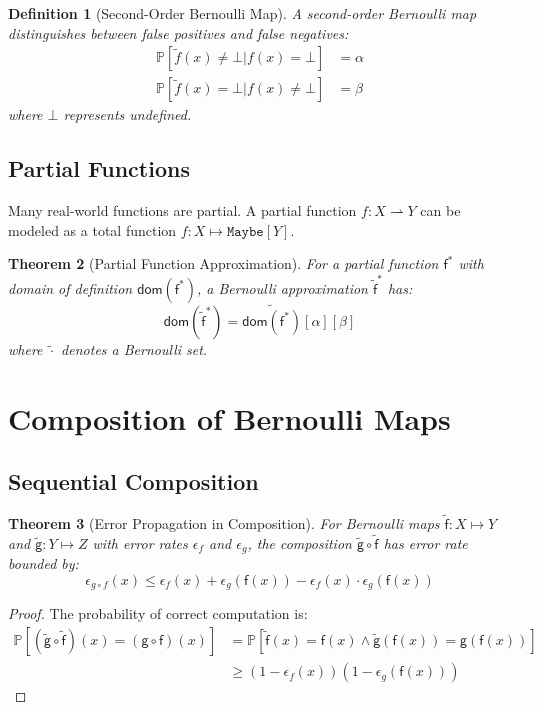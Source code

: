 \documentclass[11pt,final,hidelinks]{article}
\newtheorem{theorem}{Theorem}[section]
\newtheorem{definition}[theorem]{Definition}
\newcommand{\obs}[1]{\widetilde{#1}}  %
\newcommand{\Fun}[1]{\mathsf{#1}}     %
\newcommand{\AFun}[1]{\obs{\mathsf{#1}}}  %
\newcommand{\PFun}[1]{\mathsf{#1}^*}      %
\newcommand{\APFun}[1]{\obs{\mathsf{#1}}^*}  %
\newcommand{\Set}[1]{#1}              %
\newcommand{\ASet}[1]{\obs{#1}}       %
\newcommand{\Type}[1]{\mathtt{#1}}
\newcommand{\Prob}[1]{\mathbb{P}\left[#1\right]}
\newcommand{\fprate}{\alpha}
\newcommand{\fnrate}{\beta}
\newcommand{\error}{\epsilon}
\newcommand{\Maybe}[1]{\Type{Maybe}[#1]}
\newcommand{\pfun}{\rightharpoonup}
\newcommand{\compose}{\circ}
\newcommand{\Dom}{\mathsf{dom}}
\begin{document}
\begin{definition}[Second-Order Bernoulli Map]
A second-order Bernoulli map distinguishes between false positives and false negatives:
\begin{align}
\Prob{\obs{f}(x) \neq \bot | f(x) = \bot} &= \fprate \\
\Prob{\obs{f}(x) = \bot | f(x) \neq \bot} &= \fnrate
\end{align}
where $\bot$ represents undefined.
\end{definition}

\subsection{Partial Functions}

Many real-world functions are partial. A partial function $f : X \pfun Y$ can be modeled as a total function $f : X \mapsto \Maybe{Y}$.

\begin{theorem}[Partial Function Approximation]
For a partial function $\PFun{f}$ with domain of definition $\Dom(\PFun{f})$, a Bernoulli approximation $\APFun{f}$ has:
\begin{equation}
\Dom(\APFun{f}) = \ASet{\Dom(\PFun{f})}[\fprate][\fnrate]
\end{equation}
where $\ASet{\cdot}$ denotes a Bernoulli set.
\end{theorem}

\section{Composition of Bernoulli Maps}

\subsection{Sequential Composition}

\begin{theorem}[Error Propagation in Composition]
For Bernoulli maps $\AFun{f} : \Set{X} \mapsto \Set{Y}$ and $\AFun{g} : \Set{Y} \mapsto \Set{Z}$ with error rates $\error_f$ and $\error_g$, the composition $\AFun{g} \compose \AFun{f}$ has error rate bounded by:
\begin{equation}
\error_{g \compose f}(x) \leq \error_f(x) + \error_g(\Fun{f}(x)) - \error_f(x) \cdot \error_g(\Fun{f}(x))
\end{equation}
\end{theorem}

\begin{proof}
The probability of correct computation is:
\begin{align}
\Prob{(\AFun{g} \compose \AFun{f})(x) = (\Fun{g} \compose \Fun{f})(x)} &= \Prob{\AFun{f}(x) = \Fun{f}(x) \land \AFun{g}(\Fun{f}(x)) = \Fun{g}(\Fun{f}(x))} \\
&\geq (1 - \error_f(x))(1 - \error_g(\Fun{f}(x)))
\end{align}
\end{proof}
\end{document}

